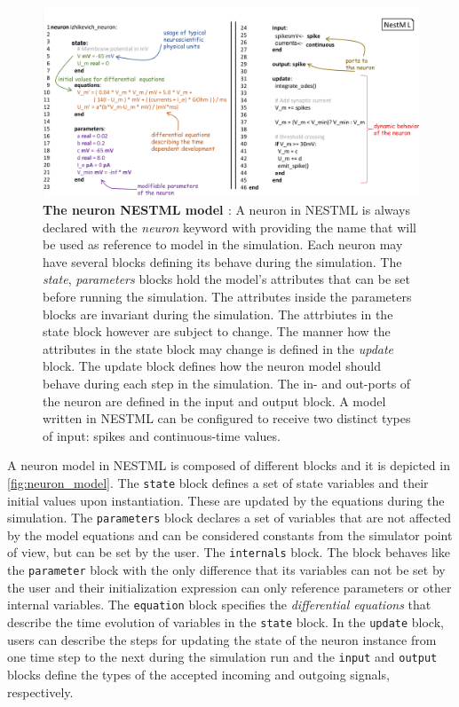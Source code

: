 \begin{figure}[ht!]
    \centering
    \includegraphics[width=0.9\linewidth]{src/pic//nestm_model.png}
    \caption{\textbf{The neuron NESTML model \cite[taken from][]{perun2018reengineering}}: A neuron in NESTML is always declared with the \emph{neuron} keyword with providing the name that will be used as reference to model in the simulation. Each neuron may have several blocks defining its behave during the simulation. The \emph{state}, \emph{parameters} blocks hold the model's attributes that can be set before running the simulation. The attributes inside the parameters blocks are invariant during the simulation. The attrbiutes in the state block however are subject to change. The manner how the attributes in the state block may change is defined in the \emph{update} block. The update block defines how the neuron model should behave during each step in the simulation. The in- and out-ports of the neuron are defined in the input and output block. A model written in NESTML can be configured to
    receive two distinct types of input: spikes and continuous-time values.} 
    \label{fig:neuron_model}
\end{figure}


A neuron model in NESTML is composed of different blocks and it is depicted in \autoref{fig:neuron_model}. The \texttt{state} block defines a set of state variables and their initial values upon instantiation. These are updated by the equations during the simulation. The \texttt{parameters} block declares a set of variables that are not affected by the model equations and can be considered constants from the simulator point of view, but can be set by the user. The \texttt{internals} block. The block behaves like the \texttt{parameter} block with the only difference that its variables can not be set by the user and their initialization expression can only reference parameters or other internal variables. The \texttt{equation} block specifies the \emph{differential equations} that describe the time evolution of variables in the \texttt{state} block. In the \texttt{update} block, users can describe the steps for updating the state of the neuron instance from one time step to the next during the simulation run and the \texttt{input} and \texttt{output} blocks define the types of the accepted incoming and outgoing signals, respectively. \vspace{1em}


